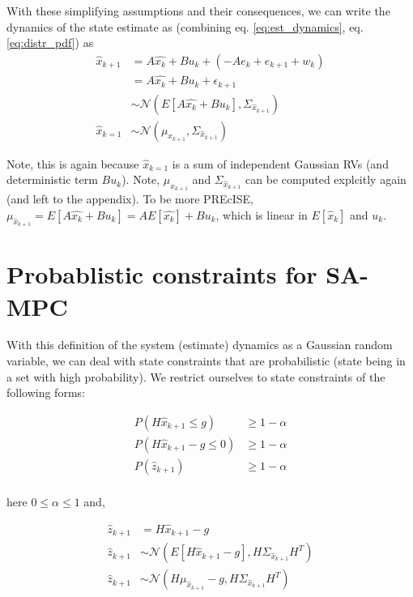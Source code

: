 \documentclass{article}[14pt]
\begin{document}
With these simplifying assumptions and their consequences, we can write the dynamics of the state estimate as (combining eq. \ref{eq:est_dynamics}, eq. \ref{eq:distr_pdf}) as
\begin{subequations}
\begin{align}
\hat{x}_{k+1} &= A\hat{x_k}+ Bu_k + (-Ae_{k}+e_{k+1}+w_k) \nonumber \\
							&= A\hat{x_k}+ Bu_k + \epsilon_{k+1} \nonumber \\
							&\sim \mathcal{N}(E[A\hat{x_k}+Bu_k], \Sigma_{\hat{x}_{k+1}}) \nonumber \\
\hat{x}_{k=1} &\sim \mathcal{N}(\mu_{x_{k+1}}, \Sigma_{\hat{x}_{k+1}})						
\end{align}
\end{subequations}

Note, this is again because $\hat{x}_{k=1}$ is a sum of independent Gaussian RVs (and deterministic term $Bu_k$). Note, $\mu_{x_{k+1}}$ and $\Sigma_{\hat{x}_{k+1}}$ can be computed explcitly again (and left to the appendix). To be more PREcISE, $\mu_{\hat{x}_{k+1}} = E[A\hat{x_k}+Bu_k] = AE[\hat{x_k}]+Bu_k$, which is linear in $E[\hat{x}_k]$ and $u_k$.

\section{Probablistic constraints for SA-MPC}
With this definition of the system (estimate) dynamics as a Gaussian random variable, we can deal with state constraints that are probabilistic (state being in a set with high probability). We restrict ourselves to state constraints of the following forms:

\begin{subequations}
\begin{align}
P(H\hat{x}_{k+1}\leq g ) &\geq 1-\alpha \nonumber \\
P(H\hat{x}_{k+1}-g\leq 0) &\geq 1-\alpha \nonumber \\
P(\hat{z}_{k+1}) &\geq 1-\alpha \nonumber \\
\end{align}
\end{subequations}

here $0\leq\alpha\leq1$ and, 

\begin{subequations}
\begin{align}
\hat{z}_{k+1} &= H\hat{x}_{k+1}-g \nonumber \\
\hat{z}_{k+1} &\sim \mathcal{N}(E[H\hat{x}_{k+1}-g],H\Sigma_{\hat{x}_{k+1}}H^{T}) \nonumber \\
\hat{z}_{k+1} &\sim \mathcal{N}(H\mu_{\hat{x}_{k+1}}-g,H\Sigma_{\hat{x}_{k+1}}H^{T})
\end{align}
\label{eq:pdf_constraint}
\end{subequations}
\end{document}
